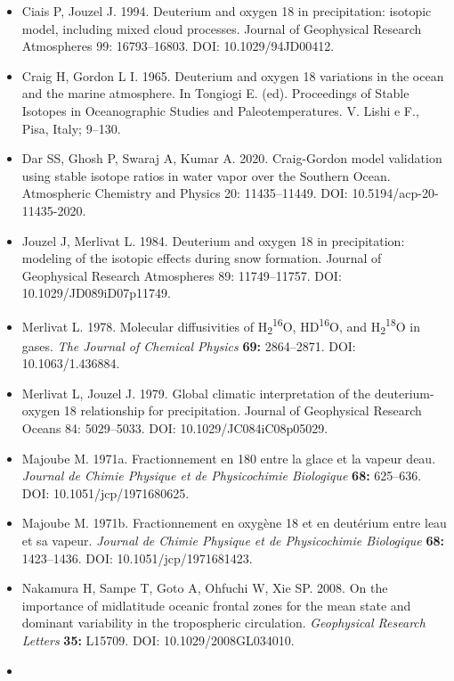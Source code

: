 \documentclass[11pt]{article}
\begin{document}
\begin{itemize}
\tightlist
\item
  Ciais P, Jouzel J. 1994. Deuterium and oxygen 18 in precipitation: isotopic model, including mixed
  cloud processes. Journal of Geophysical Research Atmospheres 99: 16793--16803. DOI:
  10.1029/94JD00412.
\item
  Craig H, Gordon L I. 1965. Deuterium and oxygen 18 variations in the ocean and the marine
  atmosphere. In Tongiogi E. (ed). Proceedings of Stable Isotopes in Oceanographic Studies and
  Paleotemperatures. V. Lishi e F., Pisa, Italy; 9--130.
\item
  Dar SS, Ghosh P, Swaraj A, Kumar A. 2020. Craig-Gordon model validation using stable isotope
  ratios in water vapor over the Southern Ocean. Atmospheric Chemistry and Physics 20: 11435--11449.
  DOI: 10.5194/acp-20-11435-2020.
\item
  Jouzel J, Merlivat L. 1984. Deuterium and oxygen 18 in precipitation: modeling of the isotopic
  effects during snow formation. Journal of Geophysical Research Atmospheres 89: 11749--11757. DOI:
  10.1029/JD089iD07p11749.
\item
  Merlivat L. 1978. Molecular diffusivities of H\textsubscript{2}\textsuperscript{16}O,
  HD\textsuperscript{16}O, and H\textsubscript{2}\textsuperscript{18}O in gases. \emph{The Journal
  of Chemical Physics} \textbf{69:} 2864--2871. DOI: 10.1063/1.436884.
\item
  Merlivat L, Jouzel J. 1979. Global climatic interpretation of the deuterium-oxygen 18 relationship
  for precipitation. Journal of Geophysical Research Oceans 84: 5029--5033. DOI:
  10.1029/JC084iC08p05029.
\item
  Majoube M. 1971a. Fractionnement en 180 entre la glace et la vapeur d\textquotesingle eau.
  \emph{Journal de Chimie Physique et de Physicochimie Biologique} \textbf{68:} 625--636. DOI:
  10.1051/jcp/1971680625.
\item
  Majoube M. 1971b. Fractionnement en oxygène 18 et en deutérium entre l\textquotesingle eau et sa
  vapeur. \emph{Journal de Chimie Physique et de Physicochimie Biologique} \textbf{68:} 1423--1436.
  DOI: 10.1051/jcp/1971681423.
\item
  Nakamura H, Sampe T, Goto A, Ohfuchi W, Xie SP. 2008. On the importance of midlatitude oceanic
  frontal zones for the mean state and dominant variability in the tropospheric circulation.
  \emph{Geophysical Research Letters} \textbf{35:} L15709. DOI: 10.1029/2008GL034010.
\item

\end{itemize}
\end{document}
